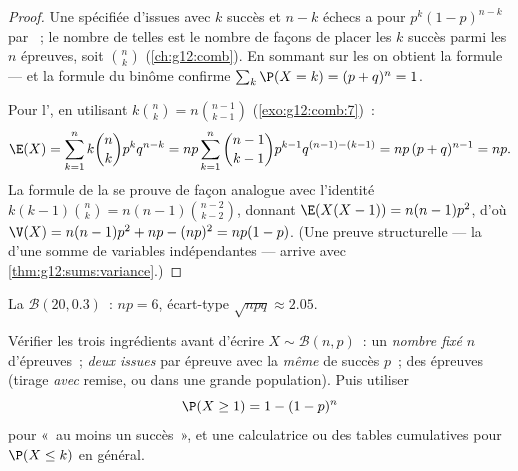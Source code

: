 \begin{proof}
Une  spécifiée d'issues avec $k$ succès et $n-k$ échecs a pour
 $p^k(1-p)^{n-k}$ par ~; le nombre de telles 
est le nombre de façons de placer les $k$ succès parmi les $n$ épreuves,
soit $\binom nk$ (\cref{ch:g12:comb}). En sommant sur les  on obtient
la formule --- et la formule du binôme confirme
$\sum_k \P(X = k) = (p + q)^n = 1$.

Pour l', en utilisant $k\binom nk = n\binom{n-1}{k-1}$
(\cref{exo:g12:comb:7})~:
\[
\E(X) = \sum_{k=1}^{n} k\binom nk p^k q^{n-k}
= np\sum_{k=1}^{n} \binom{n-1}{k-1} p^{k-1} q^{(n-1)-(k-1)}
= np\,(p + q)^{n-1} = np .
\]
La formule de la  se prouve de façon analogue avec l'identité
$k(k-1)\binom nk = n(n-1)\binom{n-2}{k-2}$, donnant
$\E(X(X-1)) = n(n-1)p^2$, d'où
$\V(X) = n(n-1)p^2 + np - (np)^2 = np(1-p)$. (Une preuve structurelle ---
la  d'une somme de variables indépendantes --- arrive avec
\cref{thm:g12:sums:variance}.)
\end{proof}

\begin{omfigure}

{\small La  $\mathcal B(20, 0.3)$~:  $np = 6$, écart-type
$\sqrt{npq} \approx 2.05$.}
\end{omfigure}

\begin{method}\label{met:g12:randvar:recognize}
Vérifier les trois ingrédients avant d'écrire $X \sim \mathcal B(n,p)$~: un
\emph{nombre fixé} $n$ d'épreuves~; \emph{deux issues} par épreuve avec la
\emph{même}  de succès $p$~; \emph{} des épreuves
(tirage \emph{avec} remise, ou dans une grande population). Puis utiliser
\[
\P(X \geq 1) = 1 - (1-p)^n
\]
pour «~au moins un succès~», et une calculatrice ou des tables cumulatives
pour $\P(X \leq k)$ en général.
\end{method}


